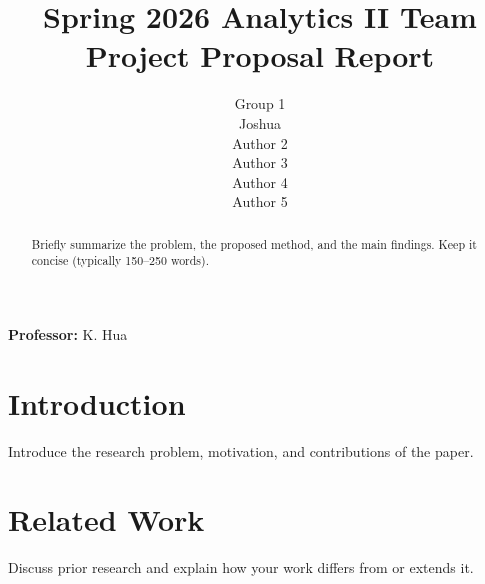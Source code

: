 \documentclass{article}
\title{Spring 2026 Analytics II Team Project Proposal Report}
\author{
  Group 1 \\[1ex]  %
  Joshua \\
  Author 2 \\
  Author 3 \\
  Author 4 \\
  Author 5
}
\begin{document}
\maketitle

\vspace{2em}  %
\begin{center}
  \textbf{Professor:} K. Hua
\end{center}

\newpage
\begin{abstract}
Briefly summarize the problem, the proposed method, and the main findings.
Keep it concise (typically 150–250 words).
\end{abstract}



\section{Introduction}
Introduce the research problem, motivation, and contributions of the paper.



\section{Related Work}
Discuss prior research and explain how your work differs from or extends it.




\end{document}

